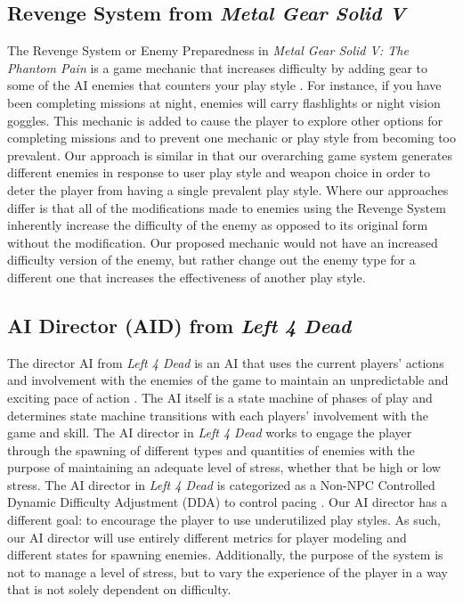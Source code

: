 \documentclass[12pt]{article}
\begin{document}
\subsection{Revenge System from \textit{Metal Gear Solid V}}
The Revenge System or Enemy Preparedness in \textit{Metal Gear Solid V: The Phantom Pain} is a game mechanic that increases difficulty by adding gear to some of the AI enemies that counters your play style \cite{zhadan2018artificial}. For instance, if you have been completing missions at night, enemies will carry flashlights or night vision goggles. This mechanic is added to cause the player to explore other options for completing missions and to prevent one mechanic or play style from becoming too prevalent. Our approach is similar in that our overarching game system generates different enemies in response to user play style and weapon choice in order to deter the player from having a single prevalent play style. Where our approaches differ is that all of the modifications made to enemies using the Revenge System inherently increase the difficulty of the enemy as opposed to its original form without the modification. Our proposed mechanic would not have an increased difficulty version of the enemy, but rather change out the enemy type for a different one that increases the effectiveness of another play style.
\subsection{AI Director (AID) from \textit{Left 4 Dead}}
The director AI from \textit{Left 4 Dead} is an AI that uses the current players' actions and involvement with the enemies of the game to maintain an unpredictable and exciting pace of action \citep{thompson_l4d}. The AI itself is a state machine of phases of play and determines state machine transitions with each players' involvement with the game and skill. The AI director in \textit{Left 4 Dead} works to engage the player through the spawning of different types and quantities of enemies with the purpose of maintaining an adequate level of stress, whether that be high or low stress. The AI director in \textit{Left 4 Dead} is categorized as a Non-NPC Controlled Dynamic Difficulty Adjustment (DDA) to control pacing \cite{zhadan2018artificial}. Our AI director has a different goal: to encourage the player to use underutilized play styles. As such, our AI director will use entirely different metrics for player modeling and different states for spawning enemies. Additionally, the purpose of the system is not to manage a level of stress, but to vary the experience of the player in a way that is not solely dependent on difficulty.
\end{document}
